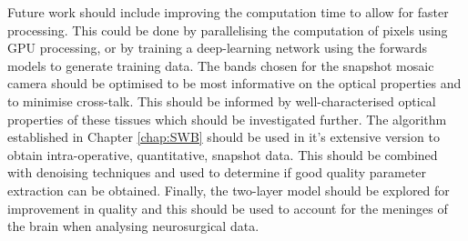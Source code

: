 Future work should include improving the computation time to allow for faster processing. This could be done by parallelising the computation of pixels using GPU processing, or by training a deep-learning network using the forwards models to generate training data. The bands chosen for the snapshot mosaic camera should be optimised to be most informative on the optical properties and to minimise cross-talk. This should be informed by well-characterised optical properties of these tissues which should be investigated further. The algorithm established in Chapter \ref{chap:SWB} should be used in it's extensive version to obtain intra-operative, quantitative, snapshot data. This should be combined with denoising techniques and used to determine if good quality parameter extraction can be obtained. Finally, the two-layer model should be explored for improvement in quality and this should be used to account for the meninges of the brain when analysing neurosurgical data. 